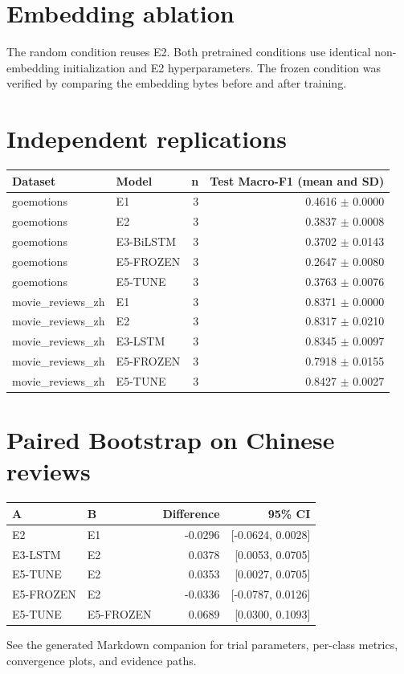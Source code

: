 \documentclass{article}
\begin{document}
\section{Embedding ablation}
The random condition reuses E2. Both pretrained conditions use identical non-embedding initialization and E2 hyperparameters. The frozen condition was verified by comparing the embedding bytes before and after training.
\section{Independent replications}
\begin{tabular}{llrr}
Dataset & Model & n & Test Macro-F1 (mean and SD) \\
\hline
goemotions & E1 & 3 & 0.4616 $\pm$ 0.0000 \\
goemotions & E2 & 3 & 0.3837 $\pm$ 0.0008 \\
goemotions & E3-BiLSTM & 3 & 0.3702 $\pm$ 0.0143 \\
goemotions & E5-FROZEN & 3 & 0.2647 $\pm$ 0.0080 \\
goemotions & E5-TUNE & 3 & 0.3763 $\pm$ 0.0076 \\
movie\_reviews\_zh & E1 & 3 & 0.8371 $\pm$ 0.0000 \\
movie\_reviews\_zh & E2 & 3 & 0.8317 $\pm$ 0.0210 \\
movie\_reviews\_zh & E3-LSTM & 3 & 0.8345 $\pm$ 0.0097 \\
movie\_reviews\_zh & E5-FROZEN & 3 & 0.7918 $\pm$ 0.0155 \\
movie\_reviews\_zh & E5-TUNE & 3 & 0.8427 $\pm$ 0.0027 \\
\end{tabular}
\section{Paired Bootstrap on Chinese reviews}
\begin{tabular}{llrr}
A & B & Difference & 95\% CI \\
\hline
E2 & E1 & -0.0296 & [-0.0624, 0.0028] \\
E3-LSTM & E2 & 0.0378 & [0.0053, 0.0705] \\
E5-TUNE & E2 & 0.0353 & [0.0027, 0.0705] \\
E5-FROZEN & E2 & -0.0336 & [-0.0787, 0.0126] \\
E5-TUNE & E5-FROZEN & 0.0689 & [0.0300, 0.1093] \\
\end{tabular}

See the generated Markdown companion for trial parameters, per-class metrics, convergence plots, and evidence paths.
\end{document}
